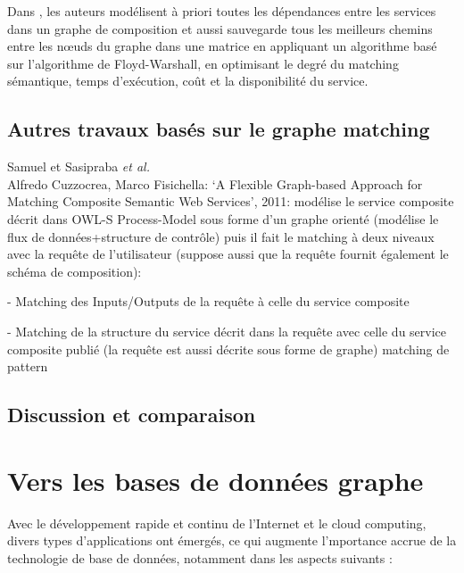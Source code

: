   \begin{text}
    Dans \cite{elmaghraoui2011graph}, les auteurs modélisent à priori
    toutes les dépendances entre les services dans un graphe de
    composition et aussi sauvegarde tous les meilleurs chemins entre
    les nœuds du graphe dans une matrice en appliquant un algorithme
    basé sur l'algorithme de Floyd-Warshall, en optimisant le degré du
    matching sémantique, temps d'exécution, coût et la disponibilité
    du service.
  \end{text}

  \subsection{Autres travaux basés sur le graphe matching}
  \label{sec:autres-travaux}
  \begin{text}
  Samuel et Sasipraba \textit{et al.} \cite{samuel2011approach}\\

  Alfredo Cuzzocrea, Marco Fisichella: ‘A Flexible Graph-based
  Approach for Matching Composite Semantic Web Services’, 2011:
  modélise le service composite décrit dans OWL-S Process-Model sous
  forme d’un graphe orienté (modélise le flux de données+structure de
  contrôle) puis il fait le matching à deux niveaux avec la requête de
  l’utilisateur (suppose aussi que la requête fournit également le
  schéma de composition):

  - Matching des Inputs/Outputs de la requête à celle du service
  composite

  - Matching de la structure du service décrit dans la requête avec
  celle du service composite publié (la requête est aussi décrite sous
  forme de graphe) matching de pattern
  \end{text}
  \newpage
  \subsection{Discussion et comparaison}
  \label{sec:discussion-comparaison}
  

\newpage
\section{Vers les bases de données graphe}
\label{sec:graph-db}

Avec le développement rapide et continu de l'Internet et le cloud
computing, divers types d'applications ont émergés, ce qui augmente
l'mportance accrue de la technologie de base de données, notamment
dans les aspects suivants \cite{han2011survey}:

